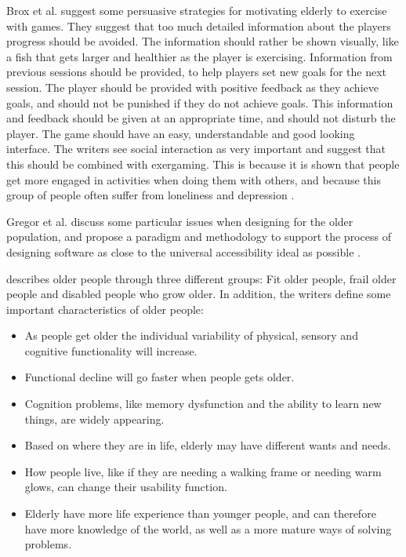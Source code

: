Brox et al. \cite{exergamesforelderly} suggest some persuasive strategies for motivating elderly to exercise with games. They suggest that too much detailed information about the players progress should be avoided. The information should rather be shown visually, like a fish that gets larger and healthier as the player is exercising. Information from previous sessions should be provided, to help players set new goals for the next session. The player should be provided with positive feedback as they achieve goals, and should not be punished if they do not achieve goals. This information and feedback should be given at an appropriate time, and should not disturb the player. The game should have an easy, understandable and good looking interface. The writers see social interaction as very important and suggest that this should be combined with exergaming. This is because it is shown that people get more engaged in activities when doing them with others, and because this group of people often suffer from loneliness and depression \cite{exergamesforelderly}. 

Gregor et al. \cite{gregor} discuss some particular issues when designing for the older population, and propose a paradigm and methodology to support the process of designing software as close to the universal accessibility ideal as possible \cite{gregor}.

\cite{gregor} describes older people through three different groups: Fit older people, frail older people and disabled people who grow older. In addition, the writers define some important characteristics of older people:
\begin{itemize}
\item As people get older the individual variability of physical, sensory and cognitive functionality will increase. 
\item Functional decline will go faster when people gets older. 
\item Cognition problems, like memory dysfunction and the ability to learn new things, are widely appearing.
\item Based on where they are in life, elderly may have different wants and needs. 
\item How people live, like if they are needing a walking frame or needing warm glows, can change their usability function.
\item Elderly have more life experience than younger people, and can therefore have more knowledge of the world, as well as a more mature ways of solving problems. 
\end{itemize}

